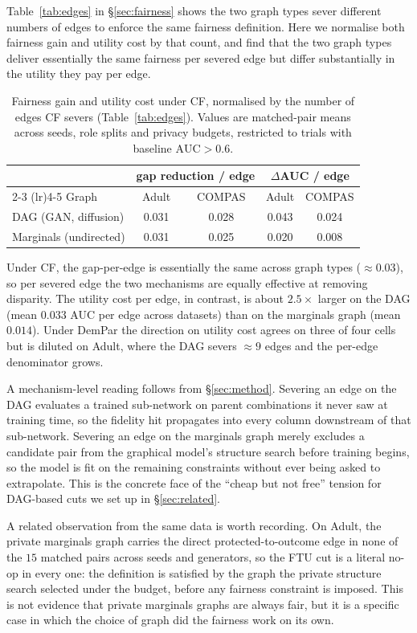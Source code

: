 \documentclass[manuscript,screen,review]{acmart}
\begin{document}
Table~\ref{tab:edges} in \S\ref{sec:fairness} shows the two graph types
sever different numbers of edges to enforce the same fairness definition.
Here we normalise both fairness gain and utility cost by that count, and
find that the two graph types deliver essentially the same fairness per
severed edge but differ substantially in the utility they pay per edge.

\begin{table}[h]
  \caption{Fairness gain and utility cost under CF, normalised by the
  number of edges CF severs (Table~\ref{tab:edges}). Values are matched-pair
  means across seeds, role splits and privacy budgets, restricted to trials
  with baseline $\mathrm{AUC}>0.6$.}
  \label{tab:per_edge}
  \centering
  \footnotesize
  \begin{tabular}{l cc cc}
    \toprule
    & \multicolumn{2}{c}{gap reduction / edge} & \multicolumn{2}{c}{$\Delta$AUC / edge} \\
    \cmidrule(lr){2-3} \cmidrule(lr){4-5}
    Graph & Adult & COMPAS & Adult & COMPAS \\
    \midrule
    DAG (GAN, diffusion)   & 0.031 & 0.028 & 0.043 & 0.024 \\
    Marginals (undirected) & 0.031 & 0.025 & 0.020 & 0.008 \\
    \bottomrule
  \end{tabular}
\end{table}

Under CF, the gap-per-edge is essentially the same across graph types
($\approx 0.03$), so per severed edge the two mechanisms are equally
effective at removing disparity. The utility cost per edge, in contrast, is
about $2.5\times$ larger on the DAG (mean $0.033$ AUC per edge across
datasets) than on the marginals graph (mean $0.014$). Under DemPar the
direction on utility cost agrees on three of four cells but is diluted on
Adult, where the DAG severs $\approx 9$ edges and the per-edge denominator
grows.

A mechanism-level reading follows from \S\ref{sec:method}. Severing an edge
on the DAG evaluates a trained sub-network on parent combinations it never
saw at training time, so the fidelity hit propagates into every column
downstream of that sub-network. Severing an edge on the marginals graph
merely excludes a candidate pair from the graphical model's structure search
before training begins, so the model is fit on the remaining constraints
without ever being asked to extrapolate. This is the concrete face of the
``cheap but not free'' tension for DAG-based cuts we set up in
\S\ref{sec:related}.

A related observation from the same data is worth recording. On Adult, the
private marginals graph carries the direct protected-to-outcome edge in none
of the $15$ matched pairs across seeds and generators, so the FTU cut is a
literal no-op in every one: the definition is satisfied by the graph the
private structure search selected under the budget, before any fairness
constraint is imposed. This is not evidence that private marginals graphs
are always fair, but it is a specific case in which the choice of graph did
the fairness work on its own.
\end{document}
